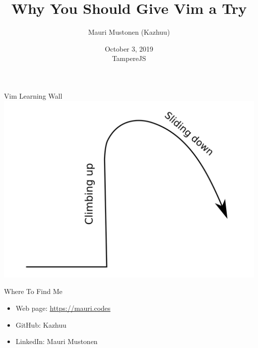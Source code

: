 \documentclass{beamer}
\title{Why You Should Give Vim a Try}
\author{Mauri Mustonen (Kazhuu)}
\date{October 3, 2019 \\ TampereJS}
\begin{document}
\maketitle

\begin{frame}{Vim Learning Wall}
    \includegraphics[width=1\textwidth]{images/vim-learning-curve.png}
\end{frame}

\begin{frame}{Where To Find Me}
    \begin{itemize}
        \item Web page: \url{https://mauri.codes}
        \item GitHub: Kazhuu
        \item LinkedIn: Mauri Mustonen
    \end{itemize}
\end{frame}
\usebackgroundtemplate{}
\end{document}
